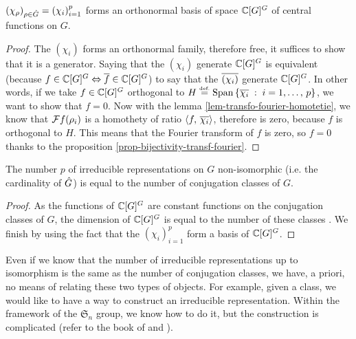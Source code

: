  
\begin{thm}
\label{thm-good-non-commutative-characters}
 $ (\chi_{\rho})_{\rho \in \hat{G}} = (\chi_i)_{i = 1}^p $ forms an orthonormal basis of space $ \mathbb{C} [G]^G $ of central functions on $G$.
\end{thm}
\begin{proof}
The $ (\chi_i) $ forms an orthonormal family, therefore free, it suffices to show that it is a generator. Saying that the $ (\chi_i) $ generate $ \mathbb{C} [G]^G $ is equivalent (because $ f \in \mathbb{C} [G]^G \Leftrightarrow \overline{f} \in \mathbb{C} [G]^G $) to say that the $ \overline{(\chi_i)} $ generate $ \mathbb{C} [G]^G $. In other words, if we take $ f \in \mathbb{C} [G]^{G} $ orthogonal to $ H \stackrel{\mbox{\upshape\tiny def.}}{=} \operatorname{Span} \left\{ \overline{\chi_i} \;:\; i = 1, \ldots, \, p \right\} $, we want to show that $ f = 0 $. Now with the lemma \ref{lem-transfo-fourier-homotetie}, we know that $ \mathcal{F} f(\rho_i) $ is a homothety of ratio $ \langle f,\,\overline{\chi_i}\rangle $, therefore is zero, because $ f $ is orthogonal to $ H $. This means that the Fourier transform of $ f $ is zero, so $ f = 0 $ thanks to the proposition \ref{prop-bijectivity-transf-fourier}.
\end{proof}
 
 
\begin{cor}
\label{cor-classes-conjugaisons-representations}
 The number $ p $ of irreducible representations on $G$ non-isomorphic (i.e. the cardinality of $ \hat{G} $) is equal to the number of conjugation classes of $G$.
\end{cor}
\begin{proof}
As the functions of $ \mathbb{C} [G]^{G} $ are constant functions on the conjugation classes of $G$, the dimension of $ \mathbb{C} [G]^{G} $ is equal to the number of these classes . We finish by using the fact that the $ (\chi_i)_{i = 1}^p $ form a basis of $ \mathbb{C} [G]^{G} $.
\end{proof}
 
 
\begin{rem}
Even if we know that the number of irreducible representations up to isomorphism is the same as the number of conjugation classes, we have, a priori, no means of relating these two types of objects. For example, given a class, we would like to have a way to construct an irreducible representation. Within the framework of the $ \mathfrak{S}_n $ group, we know how to do it, but the construction is complicated (refer to the book of  and  \cite{fulton}).
\end{rem}
 
